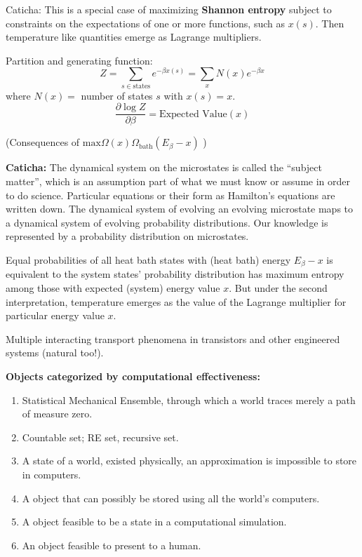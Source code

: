 \documentclass{article}
\begin{document}
Caticha: This is a special case of maximizing \textbf{Shannon entropy}
subject to constraints on the expectations of one or more functions, such as 
$x(s)$.  Then temperature like quantities emerge as Lagrange multipliers.

Partition and generating function:
\[
Z = \sum_{s\in\text{states}}e^{-\beta x(s)} = \sum_{x}N(x)e^{-\beta x} 
\]
where $N(x)= $ number of states $s$ with $x(s) = x$.
\[
\frac{\partial{\log Z}}{\partial\beta}
=
\text{Expected Value}(x)
\]

(Consequences of $\text{max}\Omega(x)\Omega_{\text{bath}}(E_\beta -x )$
\cite{CatichaEIFP})

\textbf{Caticha:} The dynamical system on the microstates is called
the ``subject matter'', which is an assumption part of what we must know or 
assume
in order to do science.  Particular equations or their form as
Hamilton's equations are written down.
The dynamical system of evolving an evolving 
microstate maps to a dynamical system of evolving probability 
distributions.  Our knowledge is represented by a probability distribution
on microstates.  

Equal probabilities of all heat bath states with (heat bath) energy 
$E_\beta -x$ is 
equivalent to the system states' probability distribution has maximum
entropy among those with expected (system) energy value $x$.  But under the
second interpretation, temperature emerges as the value of the Lagrange 
multiplier for particular energy value $x$.



Multiple interacting transport phenomena in transistors and other 
engineered systems (natural too!).
 
\textbf{Objects categorized by computational effectiveness:}
\begin{enumerate}
\item Statistical Mechanical Ensemble, through which a world traces
merely a path of measure zero.
\item Countable set; RE set, recursive set.
\item A state of a world, existed physically, an approximation is 
impossible to store in computers.
\item A object that can possibly be stored using all the world's 
computers.
\item A object feasible to be a state in a computational simulation.
\item An object feasible to present to a human.
\end{enumerate}
\end{document}
